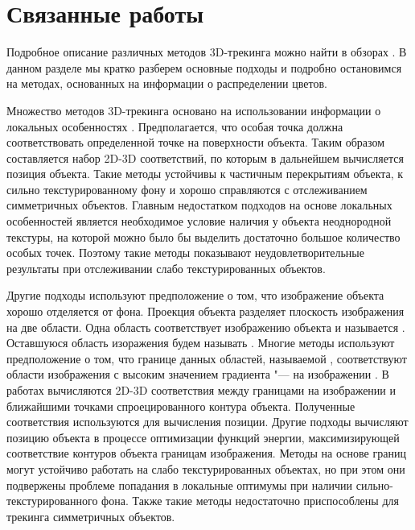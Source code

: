 \section{Связанные работы}\label{related-work}

Подробное описание различных методов 3D-трекинга можно найти в обзорах
\cite{LepetitSurvey,MarchandSurvey}.
В данном разделе мы кратко разберем основные подходы и
подробно остановимся на методах, основанных на информации о распределении
цветов.

Множество методов 3D-трекинга
\cite{Hinterstoisser2007,Vacchetti2004,Lourakis2013,Pauwels2013}
основано на использовании информации о локальных
особенностях \cite{AKAZE,SIFT,ShiAndTomasi,TomasiAndKanade,SIFT,PyrLK}.
Предполагается, что особая точка должна соответствовать определенной точке на
поверхности объекта.
Таким образом составляется набор 2D-3D соответствий, по которым в дальнейшем
вычисляется позиция объекта.
Такие методы устойчивы к частичным перекрытиям объекта, к сильно
текстурированному фону и хорошо справляются с отслеживанием симметричных
объектов.
Главным недостатком подходов на основе локальных особенностей является
необходимое условие наличия у объекта неоднородной текстуры, на которой можно
было бы выделить достаточно большое количество особых точек.
Поэтому такие методы показывают неудовлетворительные результаты при
отслеживании слабо текстурированных объектов.

Другие подходы используют предположение о том, что изображение объекта хорошо
отделяется от фона.
Проекция объекта разделяет плоскость изображения на две области.
Одна область соответствует изображению объекта и называется .
Оставшуюся область изоражения будем называть .
Многие методы используют предположение о том, что границе данных областей,
называемой , соответствуют области изображения с высоким
значением градиента "---  на изображении \cite{CANNY}.
В работах
\cite{RAPID,Marchand2003,Choi2012,Marchand2006,Klein2006,SeoHinterstoisser2014,WangZhong2015,Damen2012,VacchettiEdges2004}
вычисляются 2D-3D соответствия между границами на изображении и ближайшими
точками спроецированного контура объекта.
Полученные соответствия используются для вычисления позиции.
Другие подходы \cite{WangZhong2017,Marchand2001,Bugaev_2018_ECCV} вычисляют
позицию объекта в процессе оптимизации функций энергии, максимизирующей
соответствие контуров объекта границам изображения.
Методы на основе границ могут устойчиво работать на слабо текстурированных
объектах, но при этом они подвержены проблеме попадания в локальные оптимумы
при наличии сильно-текстурированного фона.
Также такие методы недостаточно приспособлены для трекинга симметричных
объектов.

